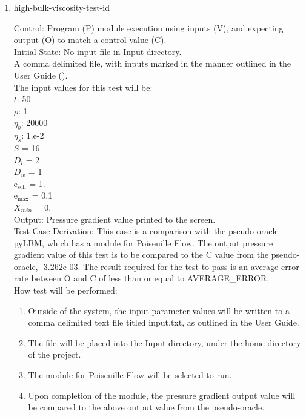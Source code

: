 \documentclass[12pt, titlepage]{article}
\newcounter{testcounter} %
\begin{document}
\begin{enumerate}
\item{high-bulk-viscosity-test-id\thetestcounter \\}

Control: Program (P) module execution using inputs (V), and expecting output (O) to match a control value (C).\\
					
Initial State: No input file in Input directory.\\
					
A comma delimited file, with inputs marked in the manner outlined in the User Guide (\citet{LBM_UserGuide_PM}).\\The input values for this test will be:\\
$t$: 50\\
$\rho$: 1\\
$\eta_b$: 20000\\
$\eta_s$: 1.e-2\\
$S$ = 16\\
$D_{l}$ = 2\\
$D_{w}$ = 1\\
$\mathrm{e_{sch}}$ = 1.\\
$\mathrm{e_{max}}$ = 0.1\\
$X_{min}$ = 0.\\

					
Output: Pressure gradient value printed to the screen.  \\

Test Case Derivation: This case is a comparison with the pseudo-oracle pyLBM, which has a module for Poiseuille Flow. The output pressure gradient value of this test is to be compared to the C value from the pseudo-oracle, -3.262e-03. The result required for the test to pass is an average error rate between O and C of less than or equal to AVERAGE\_ERROR.\\

					
How test will be performed: 

\begin{enumerate}
\item Outside of the system, the input parameter values will be written to a comma delimited text file titled input.txt, as outlined in the User Guide.
\item The file will be placed into the Input directory, under the home directory of the project.
\item The module for Poiseuille Flow will be selected to run.
\item Upon completion of the module, the pressure gradient output value will be compared to the above output value from the pseudo-oracle.
\end{enumerate}	


\end{enumerate}
\end{document}
